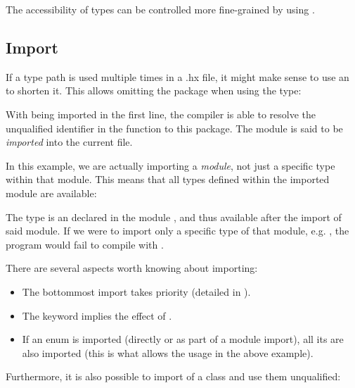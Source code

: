 The accessibility of types can be controlled more fine-grained by using .



\subsection{Import}
\label{type-system-import}

If a type path is used multiple times in a .hx file, it might make sense to use an  to shorten it. This allows omitting the package when using the type:


With  being imported in the first line, the compiler is able to resolve the unqualified identifier  in the  function to this package. The module  is said to be \emph{imported} into the current file.

In this example, we are actually importing a \emph{module}, not just a specific type within that module. This means that all types defined within the imported module are available:


The type  is an  declared in the module , and thus available after the import of said module. If we were to import only a specific type of that module, e.g. , the program would fail to compile with .

There are several aspects worth knowing about importing:

\begin{itemize}
	\item The bottommost import takes priority (detailed in ).
	\item The  keyword  implies the effect of .
	\item If an enum is imported (directly or as part of a module import), all its  are also imported (this is what allows the  usage in the above example).
\end{itemize}

Furthermore, it is also possible to import  of a class and use them unqualified:

